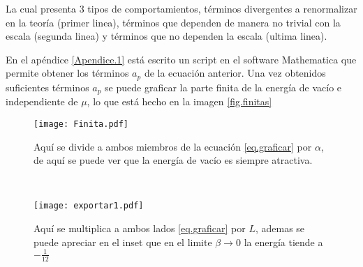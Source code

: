 La cual presenta 3 tipos de comportamientos, términos divergentes a renormalizar en la teoría (primer linea), términos que dependen de manera no trivial con la escala (segunda linea) y términos que no dependen la escala (ultima linea).


En el apéndice \ref{Apendice.1} está escrito un script en el software Mathematica que permite obtener los términos $a _p$ de la ecuación anterior. 
Una vez obtenidos suficientes términos $a_p$ se puede graficar la parte finita de la energía de vacío e independiente de $\mu$, lo que está hecho en la imagen \ref{fig.finitas}



\begin{figure*}[t!]
    \centering
    \begin{subfigure}[t]{0.5\textwidth}
        \centering
        \texttt{[image: Finita.pdf]}
        \caption{Aquí se divide a ambos miembros de la ecuación \ref{eq.graficar} por $				\alpha$, de aquí se puede ver que la energía de vacío es siempre atractiva.}
        \label{fig.izquierda}
    \end{subfigure}%
    ~ 
    \begin{subfigure}[t]{0.5\textwidth}
        \centering
        \texttt{[image: exportar1.pdf]}
        \caption{Aquí se multiplica a ambos lados \ref{eq.graficar} por $L$, ademas 				se puede apreciar en el inset que en el limite $\beta \rightarrow 0$ la energía 		tiende a $- \frac{1}{12}$}
        \label{fig.derecha}
    \end{subfigure}
    \caption{En esta imagen se muestran dos posibles adimensionalizaciones de la ecuación \ref{eq.graficar}, que representan la energía de vacío independiente de $\mu$ .}
\label{fig.finitas}
\end{figure*}


